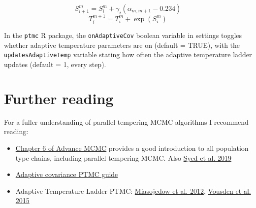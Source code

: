 \documentclass[10pt,twoside]{report} %
\begin{document}
$$S^{m}_{i+1} = S^m_i + \gamma_i(\alpha_{m, m+1}-0.234) $$
$$T_i^{m+1} = T_i^m + \exp(S_i^m) $$

In the \texttt{ptmc} R package, the \texttt{onAdaptiveCov} boolean variable in settings toggles whether adaptive temperature parameters are on (default = TRUE), with the \texttt{updatesAdaptiveTemp} variable stating how often the adaptive temperature ladder updates (default = 1, every step).


\section{Further reading}

For a fuller understanding of parallel tempering MCMC algorithms I recommend reading:

\begin{itemize}
\item \href{https://onlinelibrary.wiley.com/doi/book/10.1002/9780470669723}{Chapter 6 of Advance MCMC} provides a good introduction to all population type chains, including parallel tempering MCMC. Also \href{https://arxiv.org/pdf/1905.02939.pdf}{Syed et al. 2019}
\item \href{https://www.cs.ubc.ca/~nando/540b-2011/projects/8.pdf}{Adaptive covariance PTMC guide}
\item Adaptive Temperature Ladder PTMC: \href{https://arxiv.org/pdf/1205.1076.pdf}{Miasojedow et al. 2012}, \href{ttps://doi.org/10.1093/MNRAS/STV2422}{Vousden et al. 2015}

\end{itemize}










\end{document}
